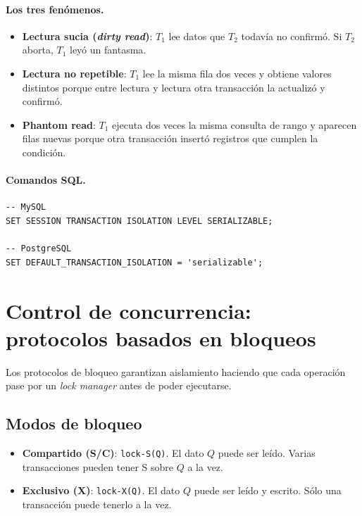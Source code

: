 \documentclass[11pt,a4paper]{article}
\begin{document}
\paragraph{Los tres fenómenos.}
\begin{itemize}
    \item \textbf{Lectura sucia (\emph{dirty read})}: $T_1$ lee datos que
    $T_2$ todavía no confirmó. Si $T_2$ aborta, $T_1$ leyó un fantasma.
    \item \textbf{Lectura no repetible}: $T_1$ lee la misma fila dos
    veces y obtiene valores distintos porque entre lectura y lectura
    otra transacción la actualizó y confirmó.
    \item \textbf{Phantom read}: $T_1$ ejecuta dos veces la misma
    consulta de rango y aparecen filas nuevas porque otra transacción
    insertó registros que cumplen la condición.
\end{itemize}

\paragraph{Comandos SQL.}
\begin{lstlisting}
-- MySQL
SET SESSION TRANSACTION ISOLATION LEVEL SERIALIZABLE;

-- PostgreSQL
SET DEFAULT_TRANSACTION_ISOLATION = 'serializable';
\end{lstlisting}

\section{Control de concurrencia: protocolos basados en bloqueos}

Los protocolos de bloqueo garantizan aislamiento haciendo que cada
operación pase por un \emph{lock manager} antes de poder ejecutarse.

\subsection{Modos de bloqueo}

\begin{itemize}
    \item \textbf{Compartido (S/C)}: \texttt{lock-S(Q)}. El dato $Q$ puede
    ser leído. Varias transacciones pueden tener S sobre $Q$ a la vez.
    \item \textbf{Exclusivo (X)}: \texttt{lock-X(Q)}. El dato $Q$ puede
    ser leído y escrito. Sólo una transacción puede tenerlo a la vez.
\end{itemize}
\end{document}
